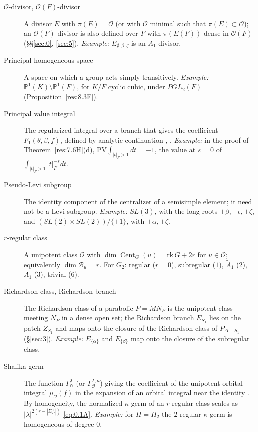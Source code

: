 \documentclass[12pt,letterpaper]{amsart}
\theoremstyle{plain}
\theoremstyle{definition}
\theoremstyle{remark}
\theoremstyle{definition}
\newcommand{\ooo}{\mathcal{O}}
\newcommand{\ovo}{\overline{\mathcal{O}}}
\DeclareMathOperator{\Cent}{Cent}
\begin{document}
\begin{description}
\item[$\ooo$-divisor, $\ooo(F)$-divisor] A divisor $E$ with $\pi(E)=\ovo$ (or
with $\ooo$ minimal such that $\pi(E)\subset\ovo$); an $\ooo(F)$-divisor is also
defined over $F$ with $\pi(E(F))$ dense in $\ooo(F)$ (\S\S\ref{sec:0},
\ref{sec:5}). \emph{Example:} $E_{\emptyset,\beta,\zeta}$ is an $A_1$-divisor.

\item[Principal homogeneous space] A space on which a group acts simply
transitively. \emph{Example:} $\mathbb P^1(K)\setminus\mathbb P^1(F)$, for $K/F$
cyclic cubic, under $PGL_2(F)$ (Proposition~\ref{res:8.3F}).

\item[Principal value integral] The regularized integral over a branch that
gives the coefficient $F_1(\theta,\beta,f)$, defined by analytic continuation
\cite{LS83}, \cite{La83}. \emph{Example:} in the proof of
Theorem~\ref{res:7.6H}(d), $\mathrm{PV}\!\int_{|t|_F>1}dt=-1$, the value at $s=0$
of $\int_{|t|_F>1}|t|_F^{-s}dt$.

\item[Pseudo-Levi subgroup] The identity component of the centralizer of a
semisimple element; it need not be a Levi subgroup. \emph{Example:} $SL(3)$,
with the long roots $\pm\beta,\pm\epsilon,\pm\zeta$, and
$(SL(2)\times SL(2))/\{\pm1\}$, with $\pm\alpha,\pm\zeta$.

\item[$r$-regular class] A unipotent class $\mathcal O$ with
$\dim\Cent_G(u)=\mathrm{rk}\,G+2r$ for $u\in\mathcal O$; equivalently
$\dim\mathcal B_u=r$. For $G_2$: regular ($r=0$), subregular ($1$), $\tilde
A_1$ ($2$), $A_1$ ($3$), trivial ($6$).

\item[Richardson class, Richardson branch] The Richardson class of a parabolic
$P=MN_P$ is the unipotent class meeting $N_P$ in a dense open set; the
Richardson branch $E_{S_1}$ lies on the patch $Z_{S_1}$ and maps onto the
closure of the Richardson class of $P_{\Delta-S_1}$ (\S\ref{sec:3}).
\emph{Example:} $E_{\{\alpha\}}$ and $E_{\{\beta\}}$ map onto the closure of the
subregular class.

\item[Shalika germ] The function $\Gamma^{T}_{\mathcal O}$ (or
$\Gamma^{T,\kappa}_{\mathcal O}$) giving the coefficient of the unipotent
orbital integral $\mu_{\mathcal O}(f)$ in the expansion of an orbital integral
near the identity \cite{Sh72}. By homogeneity, the normalized $\kappa$-germ of an
$r$-regular class scales as $|\lambda|^{2(r-|\Sigma_H^+|)}$ \eqref{eq:0.1A}.
\emph{Example:} for $H=H_2$ the $2$-regular $\kappa$-germ is homogeneous of
degree $0$.


\end{description}
\end{document}
